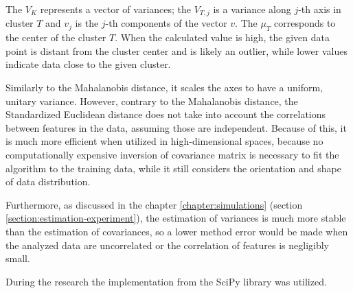 The $V_K$ represents a vector of variances; the $V_{T,j}$ is a variance along $j$-th axis in cluster $T$ and $v_j$ is the $j$-th components of the vector $v$. The $\mu_{T}$ corresponds to the center of the cluster $T$. When the calculated value is high, the given data point is distant from the cluster center and is likely an outlier, while lower values indicate data close to the given cluster.

Similarly to the Mahalanobis distance, it scales the axes to have a uniform, unitary variance. However, contrary to the Mahalanobis distance, the Standardized Euclidean distance does not take into account the correlations between features in the data, assuming those are independent. Because of this, it is much more efficient when utilized in high-dimensional spaces, because no computationally expensive inversion of covariance matrix is necessary to fit the algorithm to the training data, while it still considers the orientation and shape of data distribution.

Furthermore, as discussed in the chapter \ref{chapter:simulations} (section \ref{section:estimation-experiment}), the estimation of variances is much more stable than the estimation of covariances, so a lower method error would be made when the analyzed data are uncorrelated or the correlation of features is negligibly small.

During the research the implementation from the SciPy library \cite{SciPy-NMeth} was utilized.
